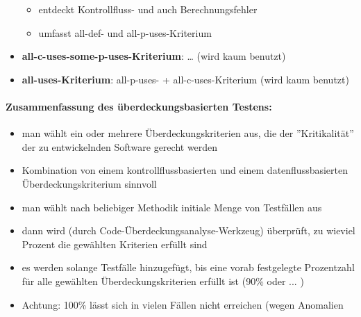 \begin{itemize}
	\begin{itemize}
		\item entdeckt Kontrollfluss- und auch Berechnungsfehler
		\item umfasst all-def- und all-p-uses-Kriterium
	\end{itemize}
	\item \textbf{all-c-uses-some-p-uses-Kriterium}: … (wird kaum benutzt)
	\item \textbf{all-uses-Kriterium}: all-p-uses- + all-c-uses-Kriterium (wird kaum benutzt)
\end{itemize}

\paragraph{Zusammenfassung des überdeckungsbasierten Testens:}
\begin{itemize}
	\item man wählt ein oder mehrere Überdeckungskriterien aus, die der ''Kritikalität'' der zu entwickelnden Software gerecht werden
	\item Kombination von einem kontrollflussbasierten und einem datenflussbasierten Überdeckungskriterium sinnvoll
	\item man wählt nach beliebiger Methodik initiale Menge von Testfällen aus
	\item dann wird (durch Code-Überdeckungsanalyse-Werkzeug) überprüft, zu wieviel Prozent die gewählten Kriterien erfüllt sind
	\item es werden solange Testfälle hinzugefügt, bis eine vorab festgelegte Prozentzahl für alle gewählten Überdeckungskriterien erfüllt ist (90\% oder ... )
	\item Achtung: 100\% lässt sich in vielen Fällen nicht erreichen (wegen Anomalien
\end{itemize}


